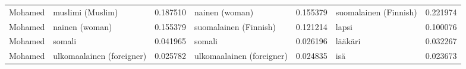 \begin{tabular}{llrlrlr}
Mohamed &          muslimi (Muslim) &                         0.187510 &            nainen (woman) &                              0.155379 &     suomalainen (Finnish) &                        0.221974 \\
Mohamed &            nainen (woman) &                         0.155379 &     suomalainen (Finnish) &                              0.121214 &                     lapsi &                        0.100076 \\
Mohamed &                    somali &                         0.041965 &                    somali &                              0.026196 &                   lääkäri &                        0.032267 \\
Mohamed & ulkomaalainen (foreigner) &                         0.025782 & ulkomaalainen (foreigner) &                              0.024835 &                       isä &                        0.023673 \\
\bottomrule
\end{tabular}
